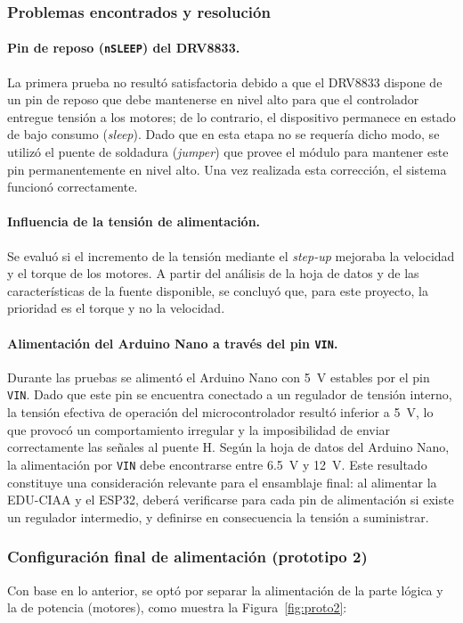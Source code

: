 \subsubsection{Problemas encontrados y resolución}

\paragraph{Pin de reposo (\texttt{nSLEEP}) del DRV8833.}
La primera prueba no resultó satisfactoria debido a que el DRV8833 dispone de un pin de reposo que debe mantenerse en nivel alto para que el controlador entregue tensión a los motores; de lo contrario, el dispositivo permanece en estado de bajo consumo (\emph{sleep}). Dado que en esta etapa no se requería dicho modo, se utilizó el puente de soldadura (\emph{jumper}) que provee el módulo para mantener este pin permanentemente en nivel alto. Una vez realizada esta corrección, el sistema funcionó correctamente.

\paragraph{Influencia de la tensión de alimentación.}
Se evaluó si el incremento de la tensión mediante el \emph{step-up} mejoraba la velocidad y el torque de los motores. A partir del análisis de la hoja de datos y de las características de la fuente disponible, se concluyó que, para este proyecto, la prioridad es el torque y no la velocidad.

\paragraph{Alimentación del Arduino Nano a través del pin \texttt{VIN}.}
Durante las pruebas se alimentó el Arduino Nano con \SI{5}{V} estables por el pin \texttt{VIN}. Dado que este pin se encuentra conectado a un regulador de tensión interno, la tensión efectiva de operación del microcontrolador resultó inferior a \SI{5}{V}, lo que provocó un comportamiento irregular y la imposibilidad de enviar correctamente las señales al puente H. Según la hoja de datos del Arduino Nano, la alimentación por \texttt{VIN} debe encontrarse entre \SI{6,5}{V} y \SI{12}{V}. Este resultado constituye una consideración relevante para el ensamblaje final: al alimentar la EDU-CIAA y el ESP32, deberá verificarse para cada pin de alimentación si existe un regulador intermedio, y definirse en consecuencia la tensión a suministrar.

\subsubsection{Configuración final de alimentación (prototipo 2)}
Con base en lo anterior, se optó por separar la alimentación de la parte lógica y la de potencia (motores), como muestra la Figura~\ref{fig:proto2}:

